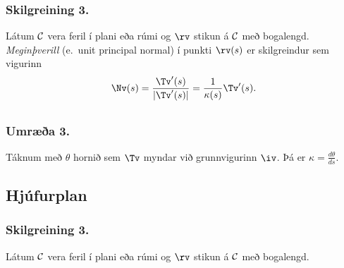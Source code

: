  \subsubsection{Skilgreining 3.}
   Látum $\cal C$ vera feril í plani eða rúmi og $\rv$ stikun á $\cal C$ með bogalengd.  {\em Meginþverill} (e.~unit principal normal) í punkti $\rv(s)$ er skilgreindur sem vigurinn 
$$\Nv(s)=\frac{\Tv'(s)}{|\Tv'(s)|}=\frac{1}{\kappa(s)}\Tv'(s).$$
 



\subsection{}
 \subsubsection{Umræða 3.}
  Táknum með $\theta$ hornið sem $\Tv$ myndar við grunnvigurinn $\iv$. Þá er $\kappa = \frac{d\theta}{ds}$.
 
 \begin{figure} [h]
\begin {center}  \end {center}
\end {figure}      



\subsection{Hjúfurplan}
 \subsubsection{Skilgreining 3.}
   Látum $\cal C$ vera feril í plani eða rúmi og $\rv$ stikun á $\cal C$ með bogalengd.  

